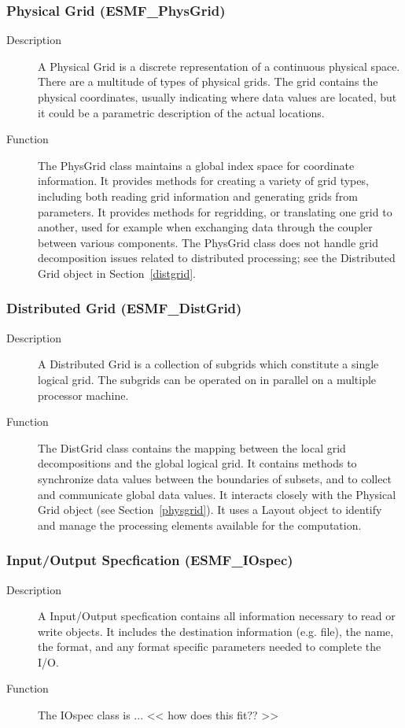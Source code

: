\subsubsection{Physical Grid (ESMF\_PhysGrid)}
\label{sec:physgrid} 
\begin{description}
\item [Description] A Physical Grid is a discrete representation of a continuous physical space.
There are a multitude of types of physical grids.
The grid contains the physical coordinates, usually indicating where data values are located, but
it could be a parametric description of the actual locations.  
\item [Function] The PhysGrid class maintains a global index space for coordinate information.
It provides methods for creating a variety of grid types, including both reading grid information
and generating grids from parameters.  It provides methods for regridding, or translating
one grid to another, used for example when exchanging data through the coupler between
various components.
The PhysGrid class does not handle grid decomposition issues related to 
distributed processing; see the Distributed Grid object in Section~\ref{distgrid}.
\end{description}

\subsubsection{Distributed Grid (ESMF\_DistGrid)} 
\label{sec:distgrid} 
\begin{description}
\item [Description] A Distributed Grid is a collection of subgrids which
constitute a single logical grid.  The subgrids can be operated on in
parallel on a multiple processor machine.  
\item [Function] The DistGrid class contains the mapping
between the local grid decompositions and the global logical grid. 
It contains methods to 
synchronize data values between the boundaries of subsets, and to
collect and communicate global data values.  It interacts closely with
the Physical Grid object (see Section~\ref{physgrid}).
It uses a Layout object to identify and manage the processing elements 
available for the computation.
\end{description}

\subsubsection{Input/Output Specfication (ESMF\_IOspec)}
\label{sec:iospec} 
\begin{description}
\item [Description] A Input/Output specfication contains all information necessary to
read or write objects.  It includes the destination information (e.g. file), the name,
the format, and any format specific parameters needed to complete the I/O.
\item [Function] The IOspec class is ...   << how does this fit?? >>
\end{description}




